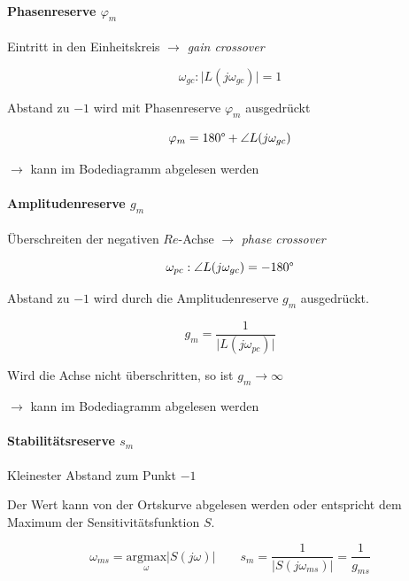 \documentclass[
  10pt,
  a4paper,
  twocolumn]{article}
\let\oldparagraph\paragraph
\renewcommand{\paragraph}[1]{\oldparagraph{#1}\mbox{}}
\numberwithin{equation}{section}
\let\paragraph\oldparagraph
\renewcommand{\paragraph}[1]{\oldparagraph{#1}\mbox{}\par}
\begin{document}
\hypertarget{phasenreserve-varphi_m}{%
\paragraph{\texorpdfstring{Phasenreserve
\(\varphi_m\)}{Phasenreserve \textbackslash varphi\_m}}\label{phasenreserve-varphi_m}}

Eintritt in den Einheitskreis \(\rightarrow\) \emph{gain crossover}

\[
\omega_{gc} : \lvert L(j\omega_{gc})\rvert = 1
\]

Abstand zu \(-1\) wird mit Phasenreserve \(\varphi_m\) ausgedrückt

\[
\varphi_m = 180\degree+\angle L(j\omega_{gc})
\]

\(\rightarrow\) kann im Bodediagramm abgelesen werden

\hypertarget{amplitudenreserve-g_m}{%
\paragraph{\texorpdfstring{Amplitudenreserve
\(g_m\)}{Amplitudenreserve g\_m}}\label{amplitudenreserve-g_m}}

Überschreiten der negativen \(Re\)-Achse \(\rightarrow\) \emph{phase
crossover}

\[
\omega_{pc} : \angle L(j\omega_{gc})= -180\degree
\]

Abstand zu \(-1\) wird durch die Amplitudenreserve \(g_m\) ausgedrückt.

\[
g_m = \frac1{\lvert L(j\omega_{pc})\rvert}
\]

Wird die Achse nicht überschritten, so ist \(g_m\rightarrow\infty\)

\(\rightarrow\) kann im Bodediagramm abgelesen werden

\hypertarget{stabilituxe4tsreserve-s_m}{%
\paragraph{\texorpdfstring{Stabilitätsreserve
\(s_m\)}{Stabilitätsreserve s\_m}}\label{stabilituxe4tsreserve-s_m}}

Kleinester Abstand zum Punkt \(-1\)

Der Wert kann von der Ortskurve abgelesen werden oder entspricht dem
Maximum der Sensitivitätsfunktion \(S\).

\[
\omega_{ms} = \underset{\omega}{\text{argmax}}\lvert S(j\omega)\rvert\qquad s_m = \frac1{\lvert S(j\omega_{ms})\rvert}=\frac1{g_{ms}}
\]
\end{document}
